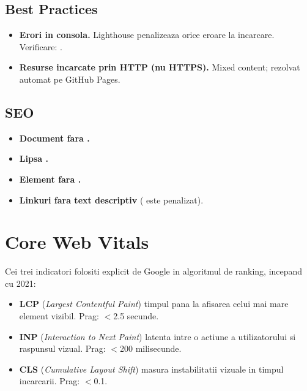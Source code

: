 \subsection{Best Practices}

\begin{itemize}
  \item \textbf{Erori in consola.} Lighthouse penalizeaza orice eroare  la incarcare. Verificare: .
  \item \textbf{Resurse incarcate prin HTTP (nu HTTPS).} Mixed content; rezolvat automat pe GitHub Pages.
\end{itemize}

\subsection{SEO}

\begin{itemize}
  \item \textbf{Document fara .}
  \item \textbf{Lipsa .}
  \item \textbf{Element  fara .}
  \item \textbf{Linkuri fara text descriptiv} ( este penalizat).
\end{itemize}

\section{Core Web Vitals}

Cei trei indicatori folositi explicit de Google in algoritmul de ranking, incepand cu 2021:

\begin{itemize}
  \item \textbf{LCP} (\emph{Largest Contentful Paint}) \textendash{} timpul pana la afisarea celui mai mare element vizibil. Prag: $<$2.5 secunde.
  \item \textbf{INP} (\emph{Interaction to Next Paint}) \textendash{} latenta intre o actiune a utilizatorului si raspunsul vizual. Prag: $<$200 milisecunde.
  \item \textbf{CLS} (\emph{Cumulative Layout Shift}) \textendash{} masura instabilitatii vizuale in timpul incarcarii. Prag: $<$0.1.
\end{itemize}

